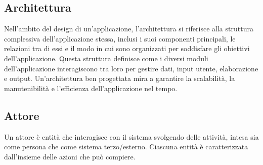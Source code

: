 \subsection*{Architettura} 
Nell'ambito del design di un'applicazione, l'architettura si riferisce alla struttura complessiva dell'applicazione stessa, inclusi i suoi componenti principali, le relazioni tra di essi e il modo in cui sono organizzati per soddisfare gli obiettivi dell'applicazione. Questa struttura definisce come i diversi moduli dell'applicazione interagiscono tra loro per gestire dati, input utente, elaborazione e output. Un'architettura ben progettata mira a garantire la scalabilità, la manutenibilità e l'efficienza dell'applicazione nel tempo.
\subsection*{Attore} 
Un attore è entità che interagisce con il sistema svolgendo delle attività, intesa sia come persona che come sistema terzo/esterno. Ciascuna entità è caratterizzata dall’insieme delle azioni che può compiere.
